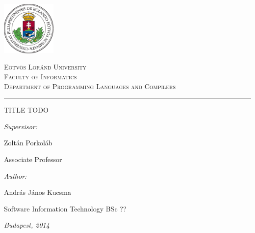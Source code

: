 \begin{titlepage}

\noindent
\parbox[m]{0.2\textwidth}{
    \includegraphics[width=0.2\textwidth]{img/elte_logo_colored.eps}
}
\hfill
\parbox[m]{0.7\textwidth}{
    \begin{center}
    \begin{large}
    \textsc{
        Eötvös Loránd University\\
        \vspace{0.5pc}
        Faculty of Informatics\\
        \vspace{0.5pc}
        Department of Programming Languages and Compilers\\
    }
    \end{large}
    \end{center}
}

\vspace{1pc}
\hrule

\vfill

\begin{center}
    {\LARGE TITLE TODO}
\end{center}

\vfill

\noindent
\hspace*{0.05\textwidth}
\parbox{0.45\textwidth}{
    {\it Supervisor:}
    \bigskip

    {\Large Zoltán Porkoláb}
    \smallskip

    Associate Professor
}
\hfill
\parbox{0.45\textwidth}{
    {\it Author:}
    \bigskip

    {\Large András János Kucsma}
    \smallskip

    Software Information Technology BSc ??
}


\vfill

\begin{center}
    {\large {\it Budapest, 2014}}
\end{center}

\end{titlepage}
